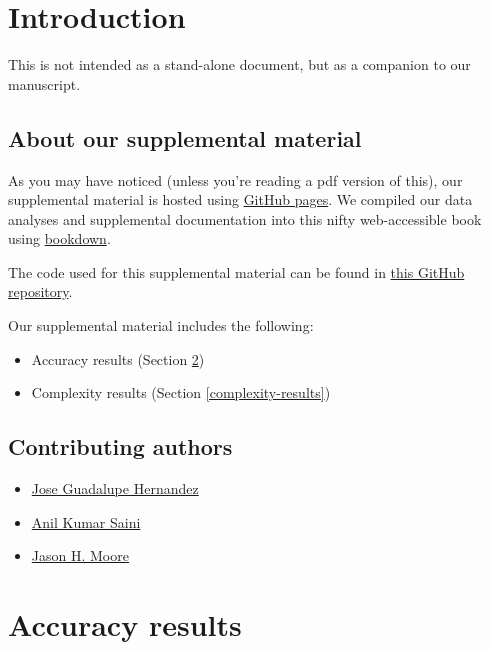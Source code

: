 \documentclass[
]{book}
\providecommand{\tightlist}{%
  \setlength{\itemsep}{0pt}\setlength{\parskip}{0pt}}
\begin{document}
\hypertarget{introduction}{%
\chapter{Introduction}\label{introduction}}

This is not intended as a stand-alone document, but as a companion to our manuscript.

\hypertarget{about-our-supplemental-material}{%
\section{About our supplemental material}\label{about-our-supplemental-material}}

As you may have noticed (unless you're reading a pdf version of this), our supplemental material is hosted using \href{https://pages.github.com/}{GitHub pages}.
We compiled our data analyses and supplemental documentation into this nifty web-accessible book using \href{https://bookdown.org}{bookdown}.

The code used for this supplemental material can be found in \href{https://github.com/jgh9094/GECCO-2024-LEXIDATE-EVALUATION}{this GitHub repository}.

Our supplemental material includes the following:

\begin{itemize}
\tightlist
\item
  Accuracy results (Section \ref{accuracy-results})
\item
  Complexity results (Section \ref{complexity-results})
\end{itemize}

\hypertarget{contributing-authors}{%
\section{Contributing authors}\label{contributing-authors}}

\begin{itemize}
\tightlist
\item
  \href{https://jgh9094.github.io/}{Jose Guadalupe Hernandez}
\item
  \href{https://theaksaini.github.io/}{Anil Kumar Saini}
\item
  \href{https://jasonhmoore.org/}{Jason H. Moore}
\end{itemize}

\hypertarget{accuracy-results}{%
\chapter{Accuracy results}\label{accuracy-results}}
\end{document}
